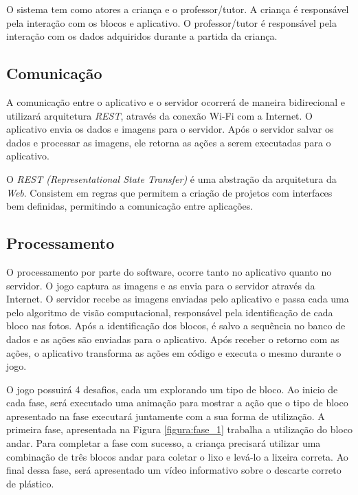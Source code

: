     O sistema tem como atores a criança e o professor/tutor. A criança é responsável pela interação com os blocos e aplicativo.
    O professor/tutor é responsável pela interação com os dados adquiridos durante a partida da criança.
    
    \subsection{Comunicação}
    A comunicação entre o aplicativo e o servidor ocorrerá de maneira bidirecional e utilizará arquitetura \textit{REST}, através da conexão Wi-Fi com a Internet.
    O aplicativo envia os dados e imagens para o servidor. Após o servidor salvar os dados e processar as imagens, ele retorna as ações a serem executadas para o aplicativo.
    
    O \textit{REST (Representational State Transfer)} é uma abstração da arquitetura da \textit{Web}. Consistem em regras que permitem a criação de projetos com interfaces bem definidas, permitindo a comunicação entre aplicações.
    
    \subsection{Processamento}
    O processamento por parte do software, ocorre tanto no aplicativo quanto no servidor. O jogo captura as imagens e as envia para o servidor através da Internet. O servidor recebe as imagens enviadas pelo aplicativo e passa cada uma pelo algoritmo de visão computacional, responsável pela identificação de cada bloco nas fotos. Após a identificação dos blocos, é salvo a sequência no banco de dados e as ações são enviadas para o aplicativo.
    Após receber o retorno com as ações, o aplicativo transforma as ações em código e executa o mesmo durante o jogo.
    
    O jogo possuirá 4 desafios, cada um explorando um tipo de bloco. Ao inicio de cada fase, será executado uma animação para mostrar a ação que o tipo de bloco apresentado na fase executará juntamente com a sua forma de utilização.
    A primeira fase, apresentada na Figura \ref{figura:fase_1} trabalha a utilização do bloco andar. Para completar a fase com sucesso, a criança precisará utilizar uma combinação de três blocos andar para coletar o lixo e levá-lo a lixeira correta. Ao final dessa fase, será apresentado um vídeo informativo sobre o descarte correto de plástico.
    
